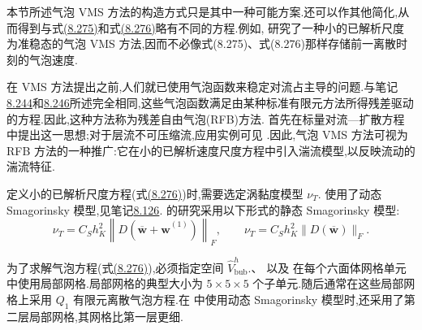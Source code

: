 \begin{note}
\label{note:vms-other-bubble-methods}
本节所述气泡 VMS 方法的构造方式只是其中一种可能方案.还可以作其他简化,从而得到与式\hyperref[eq:vms-bubble-large-scale-method]{(8.275)}和式\hyperref[eq:vms-bubble-small-scale-method]{(8.276)}略有不同的方程.例如,\textcite{JohnKindl2010a} 研究了一种小的已解析尺度为准稳态的气泡 VMS 方法,因而不必像式(8.275)、式(8.276)那样存储前一离散时刻的气泡速度.
\end{note}

\begin{note}[残差自由气泡方法]
\label{note:vms-residual-free-bubbles}
在 VMS 方法提出之前,人们就已使用气泡函数来稳定对流占主导的问题.与笔记\hyperref[note:vms-bubble-pressure-model]{8.244}和\hyperref[note:vms-bubble-time-dependent-method]{8.246}所述完全相同,这些气泡函数满足由某种标准有限元方法所得残差驱动的方程.因此,这种方法称为残差自由气泡(RFB)方法.\textcite{BrezziRusso1994} 首先在标量对流—扩散方程中提出这一思想;对于层流不可压缩流,应用实例可见 \textcite{FrancaNesliturk2001}.因此,气泡 VMS 方法可视为 RFB 方法的一种推广:它在小的已解析速度尺度方程中引入湍流模型,以反映流动的湍流特征.
\end{note}

\begin{note}[湍流模型的选取]
\label{note:vms-bubble-turbulence-model}
定义小的已解析尺度方程(式\hyperref[eq:vms-bubble-small-scale-method]{(8.276)})时,需要选定涡黏度模型 $\nu_T$.\textcite{GravemeierWallRamm2004,GravemeierWallRamm2005} 使用了动态 Smagorinsky 模型,见笔记\hyperref[note:dynamic-smagorinsky-model]{8.126}.\textcite{JohnKindl2010a} 的研究采用以下形式的静态 Smagorinsky 模型:
\begin{equation}\label{eq:vms-bubble-smagorinsky-models}
 \nu_T=C_S h_K^2\left\|D(\overline{\bm w}
               +\widehat{\bm w}^{(1)})\right\|_F,
 \qquad
 \nu_T=C_S h_K^2\|D(\overline{\bm w})\|_F.
\end{equation}
\end{note}

\begin{note}[用气泡函数逼近小的已解析速度尺度]
\label{note:vms-bubble-approximation}
为了求解气泡方程(式\hyperref[eq:vms-bubble-small-scale-method]{(8.276)}),必须指定空间 $\widehat V^h_{\mathrm{bub}}$.\textcite{GravemeierWallRamm2004,GravemeierWallRamm2005}、\textcite{Gravemeier2006c} 以及 \textcite{JohnKindl2010a} 在每个六面体网格单元中使用局部网格.局部网格的典型大小为 $5\times5\times5$ 个子单元.随后通常在这些局部网格上采用 $Q_1$ 有限元离散气泡方程.在 \textcite{GravemeierWallRamm2004,GravemeierWallRamm2005} 中使用动态 Smagorinsky 模型时,还采用了第二层局部网格,其网格比第一层更细.
\end{note}

